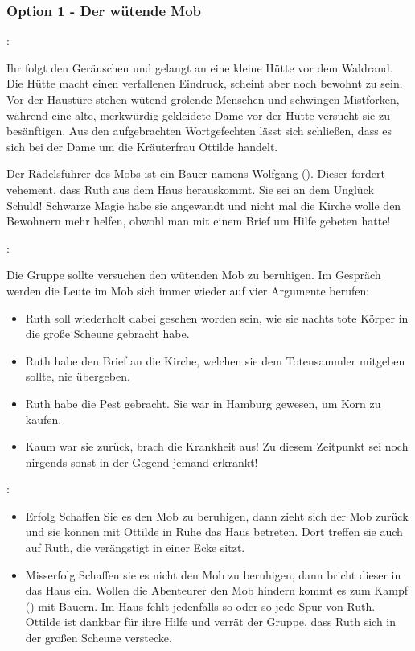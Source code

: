 \subsubsection{Option 1 - Der wütende Mob}
\label{mob}

:

Ihr folgt den Geräuschen und gelangt an eine kleine Hütte vor dem Waldrand. Die Hütte macht einen verfallenen Eindruck, scheint aber noch bewohnt zu sein. Vor der Haustüre stehen wütend grölende Menschen und schwingen Mistforken, während eine alte, merkwürdig gekleidete Dame vor der Hütte versucht sie zu besänftigen.
Aus den aufgebrachten Wortgefechten lässt sich schließen, dass es sich bei der Dame um die Kräuterfrau Ottilde handelt.

Der Rädelsführer des Mobs ist ein Bauer namens Wolfgang (\blue{\ref{Wolfgang}}). Dieser fordert vehement, dass Ruth aus dem Haus herauskommt. Sie sei an dem Unglück Schuld! Schwarze Magie habe sie angewandt und nicht mal die Kirche wolle den Bewohnern mehr helfen, obwohl man mit einem Brief um Hilfe gebeten hatte!

:

Die Gruppe sollte versuchen den wütenden Mob zu beruhigen. Im Gespräch werden die Leute im Mob sich immer wieder auf vier Argumente berufen:

\begin{itemize}
  \item Ruth soll wiederholt dabei gesehen worden sein, wie sie nachts tote Körper in die große Scheune gebracht habe.
  \item Ruth habe den Brief an die Kirche, welchen sie dem Totensammler mitgeben sollte, nie übergeben.
  \item Ruth habe die Pest gebracht. Sie war in Hamburg gewesen, um Korn zu kaufen.
  \item Kaum war sie zurück, brach die Krankheit aus! Zu diesem Zeitpunkt sei noch nirgends sonst in der Gegend jemand erkrankt!
\end{itemize}

:

\begin{itemize}
  \item Erfolg
  Schaffen Sie es den Mob zu beruhigen, dann zieht sich der Mob zurück und sie können mit Ottilde in Ruhe das Haus betreten. Dort treffen sie auch auf Ruth, die verängstigt in einer Ecke sitzt.
  \item Misserfolg
  Schaffen sie es nicht den Mob zu beruhigen, dann bricht dieser in das Haus ein. Wollen die Abenteurer den Mob hindern kommt es zum Kampf (\blue{\ref{kampf}}) mit Bauern. Im Haus fehlt jedenfalls so oder so jede Spur von Ruth. Ottilde ist dankbar für ihre Hilfe und verrät der Gruppe, dass Ruth sich in der großen Scheune verstecke.
\end{itemize}

